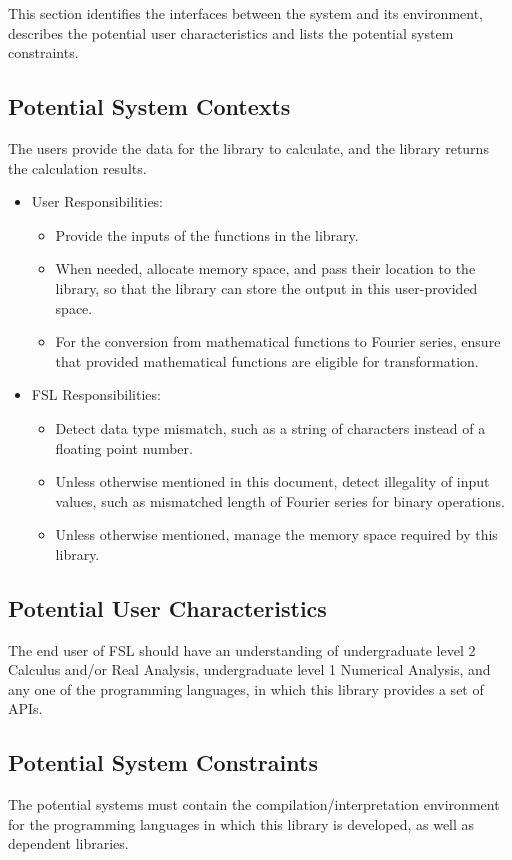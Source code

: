 \documentclass[12pt]{article}
\newcommand{\famname}{FSL} %
\begin{document}
This section identifies the interfaces between the system and its environment,
describes the potential user characteristics and lists the potential system
constraints.

\subsection{Potential System Contexts}

The users provide the data for the library to  calculate, and the library 
returns the calculation results.
\begin{itemize}
\item User Responsibilities:
\begin{itemize}
\item Provide the inputs of the functions in the library.
\item When needed, allocate memory space, and pass their location to the library, so that the library can store the output in this user-provided space.
\item For the conversion from mathematical functions to Fourier series, 
ensure that provided mathematical functions are eligible for transformation. 
\end{itemize}
\item \famname{} Responsibilities:
\begin{itemize}
\item Detect data type mismatch, such as a string of characters 
instead of a floating point number.
\item Unless otherwise mentioned in this document, detect illegality 
of input values, such as mismatched length of Fourier series 
for binary operations.
\item Unless otherwise mentioned, manage the memory space 
required by this library.
\end{itemize}
\end{itemize}

\subsection{Potential User Characteristics} \label{SecUserCharacteristics}

The end user of \famname{} should have an understanding of undergraduate 
level 2 Calculus and/or Real Analysis, undergraduate level 1 Numerical 
Analysis, and any one of the programming languages, in which this library 
provides a set of APIs.

\subsection{Potential System Constraints}
The potential systems must contain the compilation/interpretation environment 
for the programming languages in which this library is developed, as well 
as dependent libraries.
\end{document}
